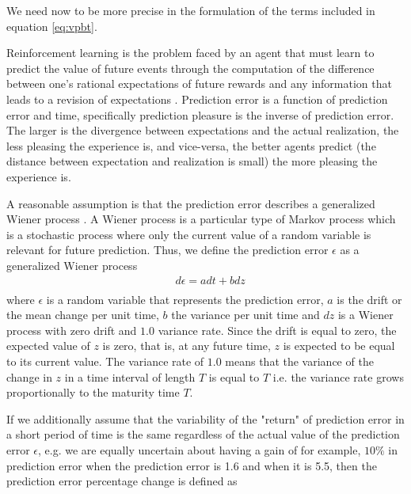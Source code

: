 \documentclass[11pt, onecolumn]{article}
\begin{document}
We need now to be more precise in the formulation of the terms included in equation \ref{eq:vpbt}. 

Reinforcement learning is the problem faced by an agent that must learn to predict the value of future events through the computation of the difference between one’s rational expectations of future rewards and any information that leads to a revision of expectations \citep{glimcher_understanding_2011}. Prediction error is a function of prediction error and time, specifically prediction pleasure is the inverse of prediction error. The larger is the divergence between expectations and the actual realization, the less pleasing the experience is, and vice-versa, the better agents predict (the distance between expectation and realization is small) the more pleasing the experience is.

A reasonable assumption is that the prediction error describes a generalized Wiener process \citep{ross_stochastic_1996}. A Wiener process is a particular type of Markov process which is a stochastic process where only the current value of a random variable is relevant for future prediction.  
Thus, we define the prediction error $\epsilon$ as a generalized Wiener process 
\begin{equation}
\begin{split}
& d \epsilon= a dt + b dz \\
\end{split}
\label{eq:genwiener}
\end{equation}
where $\epsilon$ is a random variable that represents the prediction error, $a$ is the drift or the mean change per unit time, $b$ the variance per unit time and $dz$ is a Wiener process with zero drift and $1.0$ variance rate. Since the drift is equal to zero, the expected value of $z$ is zero, that is, at any future time, $z$ is expected to be equal to its current value. The variance rate of $1.0$ means that the variance of the change in $z$ in a time interval of length $T$ is equal to $T$ i.e. the variance rate grows proportionally to the maturity time $T$. 

If we additionally assume that the variability of the "return" of prediction error in a short period of time is the same regardless of the actual value of the prediction error $\epsilon$, e.g. we are equally uncertain about having a gain of for example, $10\%$ in prediction error when the prediction error is 1.6 and when it is 5.5, then the prediction error percentage change is defined as
\end{document}
